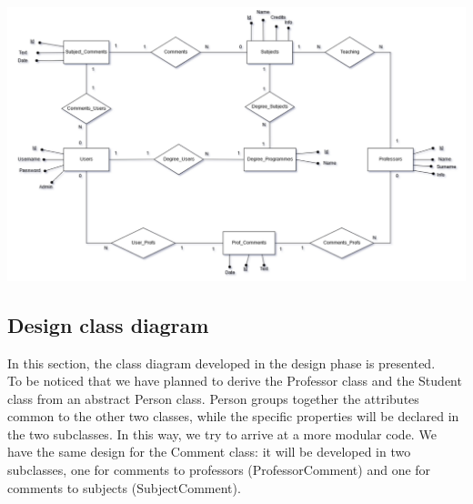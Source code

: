 \documentclass[a4paper, oneside]{article}
\begin{document}
\begin{minipage}{\linewidth}
\begin{center}
\vspace{1mm}
\includegraphics[width=155mm]{./images/diagrams/er_diagram.png} 
\vspace{2mm}
\label{fig:diagramma_er}
\end{center}
\end{minipage}

\vspace{19mm}

\subsection{Design class diagram}
In this section, the class diagram developed in the design phase is presented. \\
To be noticed that we have planned to derive the Professor class and the Student class from an abstract Person class. Person groups together the attributes common to the other two classes, while the specific properties will be declared in the two subclasses. In this way, we try to arrive at a more modular code. We have the same design for the Comment class: it will be developed in two subclasses, one for comments to professors (ProfessorComment) and one for comments to subjects (SubjectComment).
\end{document}
